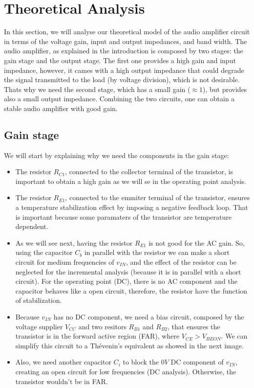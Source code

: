 \section{Theoretical Analysis}
\label{sec:analysis}

\par In this section, we will analyse our theoretical model of the audio amplifier circuit in terms of the voltage gain, input and output impedances, and band width. The audio amplifier, as explained in the introduction is composed by two stages: the gain stage and the output stage. The first one provides a high gain and input impedance, however, it cames with a high output impedance that could degrade the signal transmitted to the load (by voltage division), which is not desirable. Thats why we need the second stage, which has a small gain ($\approx 1$), but provides also a small output impedance. Combining the two circuits, one can obtain a stable audio amplifier with good gain.
 
\subsection{Gain stage}
\label{subsec:gain_stage}


\par We will start by explaining why we need the components in the gain stage:

\begin{itemize}
\item The resistor $R_{C1}$, connected to the collector terminal of the transistor, is important to obtain a high gain as we will se in the operating point analysis.
\item The resistor $R_{E1}$, connected to the emmiter terminal of the transistor, ensures a temperature stabilization effect by imposing a negative feedback loop. That is important because some paramaters of the transistor are temperature dependent.
\item As we will see next, having the resistor $R_{E1}$ is not good for the AC gain. So, using the capacitor $C_b$ in parallel with the resistor we can make a short circuit for medium frequencies of $v_{IN}$, and the effect of the resistor can be neglected for the incremental analysis (because it is in parallel with a short circuit). For the operating point (DC), there is no AC component and the capacitor behaves like a open circuit, therefore, the resistor have the function of stabilization.
\item Because $v_{IN}$ has no DC component, we need a bias circuit, composed by the voltage supplier $V_{CC}$ and two resitors $R_{B1}$ and $R_{B2}$, that ensures the transistor is in the forward active region (FAR), where $V_{CE}>V_{BEON}$. We can simplify this circuit to a Thévenin's equivalent as showed in the next image. 
\item Also, we need another capacitor $C_i$ to block the $0V$ DC component of $v_{IN}$, creating an open circuit for low frequencies (DC analysis). Otherwise, the transistor wouldn't be in FAR. 
\end{itemize}

